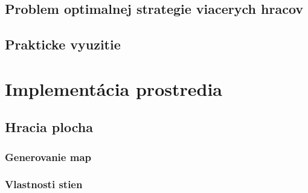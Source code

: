 \documentclass[a4paper,11pt,final]{report}
\begin{document}
\section{Problem optimalnej strategie viacerych hracov}
\section{Prakticke vyuzitie}
\chapter{Implementácia prostredia}
\section{Hracia plocha} %
\subsection{Generovanie map}%
\subsection{Vlastnosti stien} %
\end{document}

